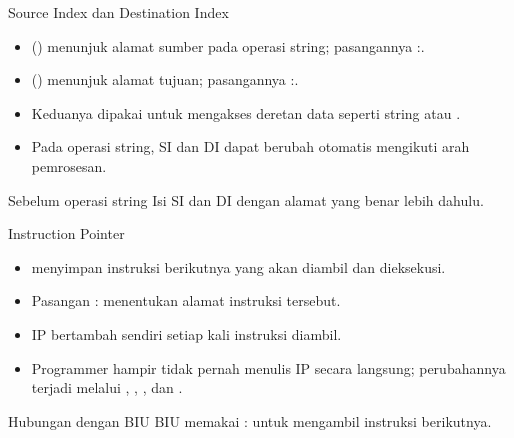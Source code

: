 \documentclass[aspectratio=169,11pt]{beamer}
\begin{document}
\begin{frame}{Source Index dan Destination Index}
\small
\begin{itemize}
    \item {} () menunjuk alamat sumber pada
          operasi string; pasangannya :.

    \vspace{0.18em}
    \item {} () menunjuk alamat tujuan;
          pasangannya :.

    \vspace{0.18em}
    \item Keduanya dipakai untuk mengakses deretan data seperti
          string atau .

    \vspace{0.18em}
    \item Pada operasi string, SI dan DI dapat berubah otomatis
          mengikuti arah pemrosesan.
\end{itemize}

\vspace{0.25em}
\begin{block}{Sebelum operasi string}
\small Isi SI dan DI dengan alamat yang benar lebih dahulu.
\end{block}
\end{frame}

\begin{frame}{Instruction Pointer}
\small
\begin{itemize}
    \item {} menyimpan  instruksi berikutnya yang
          akan diambil dan dieksekusi.

    \vspace{0.18em}
    \item Pasangan : menentukan alamat instruksi
          tersebut.

    \vspace{0.18em}
    \item IP bertambah sendiri setiap kali instruksi diambil.

    \vspace{0.18em}
    \item Programmer hampir tidak pernah menulis IP secara langsung;
          perubahannya terjadi melalui , ,
          , dan .
\end{itemize}

\vspace{0.25em}
\begin{block}{Hubungan dengan BIU}
\small BIU memakai : untuk mengambil instruksi
berikutnya.
\end{block}
\end{frame}
\end{document}
